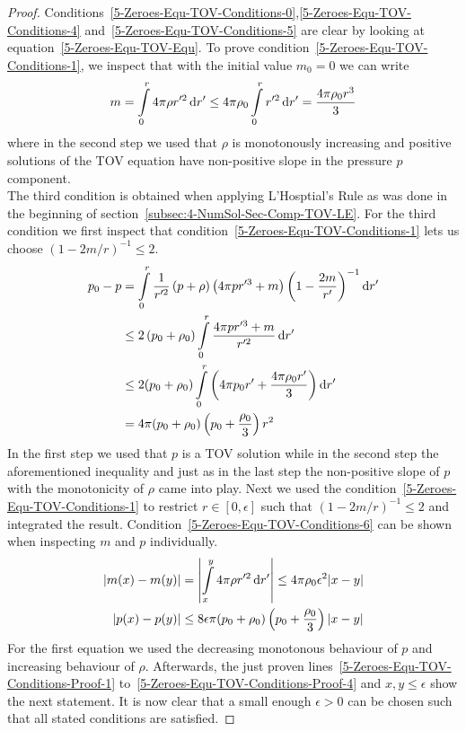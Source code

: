 \begin{proof}
	Conditions~\eqref{5-Zeroes-Equ-TOV-Conditions-0},\eqref{5-Zeroes-Equ-TOV-Conditions-4} and~\eqref{5-Zeroes-Equ-TOV-Conditions-5} are clear by looking at equation~\eqref{5-Zeroes-Equ-TOV-Equ}.
	To prove condition~\eqref{5-Zeroes-Equ-TOV-Conditions-1}, we inspect that with the initial value $m_0=0$ we can write
	\begin{equation}
		m = \int\limits_0^r 4\pi\rho r'^2 \mathop{}\!\mathrm{d} r'\leq4\pi\rho_0\int\limits_0^r r'^2 \mathop{}\!\mathrm{d} r'=\frac{4\pi\rho_0 r^3}{3}
		\label{eq:5-Zeroes-TOv-Conditions-Proof-Intermed-1}
	\end{equation}
	where in the second step we used that $\rho$ is monotonously increasing and positive solutions of the \ac{TOV} equation have non-positive slope in the pressure $p$ component.\\
	The third condition is obtained when applying L'Hosptial's Rule as was done in the beginning of section~\ref{subsec:4-NumSol-Sec-Comp-TOV-LE}.
	For the third condition we first inspect that condition~\ref{5-Zeroes-Equ-TOV-Conditions-1} lets us choose $(1-2m/r)^{-1}\leq 2$.
	\begin{align}
		p_0 - p &=\int\limits_0^r\frac{1}{r'^2}\left(p+\rho\right)\left(4\pi pr'^3+m\right)\left(1-\frac{2m}{r'}\right)^{-1}\mathop{}\!\mathrm{d} r'\label{5-Zeroes-Equ-TOV-Conditions-Proof-1}\\
				&\leq2\left(p_0+\rho_0\right)\int\limits_0^r\frac{4\pi pr'^3+m}{r'^2}\mathop{}\!\mathrm{d} r'\label{5-Zeroes-Equ-TOV-Conditions-Proof-2}\\
				&\leq2(p_0+\rho_0)\int\limits_0^r\left(4\pi p_0 r' + \frac{4\pi\rho_0 r'}{3}\right)\mathop{}\!\mathrm{d} r'\label{5-Zeroes-Equ-TOV-Conditions-Proof-3}\\
				&=4\pi(p_0+\rho_0)\left(p_0+\frac{\rho_0}{3}\right)r^2\label{5-Zeroes-Equ-TOV-Conditions-Proof-4}
	\end{align}
	In the first step we used that $p$ is a \ac{TOV} solution while in the second step the aforementioned inequality and just as in the last step the non-positive slope of $p$ with the monotonicity of $\rho$ came into play.
	Next we used the condition~\ref{5-Zeroes-Equ-TOV-Conditions-1} to restrict $r\in[0,\epsilon]$ such that $(1-2m/r)^{-1}\leq2$ and integrated the result.
	Condition~\eqref{5-Zeroes-Equ-TOV-Conditions-6} can be shown when inspecting $m$ and $p$ individually.
	\begin{align}
		|m(x)-m(y)|&=\left|\int\limits_x^y 4\pi\rho r'^2 \mathop{}\!\mathrm{d} r'\right|\leq4\pi\rho_0\epsilon^2|x-y|\\
		|p(x)-p(y)|&\leq8\epsilon\pi(p_0+\rho_0)\left(p_0+\frac{\rho_0}{3}\right)|x-y|
	\end{align}
	For the first equation we used the decreasing monotonous behaviour of $p$ and increasing behaviour of $\rho$.
	Afterwards, the just proven lines~\eqref{5-Zeroes-Equ-TOV-Conditions-Proof-1} to~\eqref{5-Zeroes-Equ-TOV-Conditions-Proof-4} and $x,y\leq\epsilon$ show the next statement.
	It is now clear that a small enough $\epsilon>0$ can be chosen such that all stated conditions are satisfied.
\end{proof}\noindent
